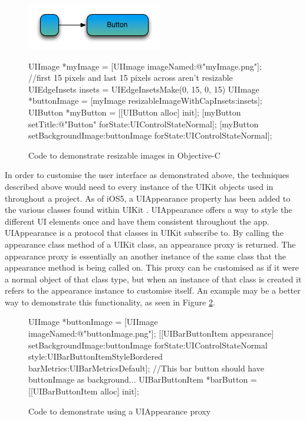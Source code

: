 \documentclass[12pt]{report}
\begin{document}
\begin{figure}[h!]
\includegraphics[scale=0.75]{images/resize-image}
\begin{objccode}
    UIImage *myImage = [UIImage imageNamed:@"myImage.png"];
    //first 15 pixels and last 15 pixels across aren't resizable
    UIEdgeInsets insets = UIEdgeInsetsMake(0, 15, 0, 15)
    UIImage *buttonImage = [myImage resizableImageWithCapInsets:insets];
    UIButton *myButton = [[UIButton alloc] init];
    [myButton setTitle:@"Button" forState:UIControlStateNormal];
    [myButton setBackgroundImage:buttonImage forState:UIControlStateNormal];
\end{objccode}
\label{fig:resizableimage}
\caption{Code to demonstrate resizable images in Objective-C}
\end{figure}


In order to customise the user interface as demonstrated above, the techniques described above would need to every instance of the UIKit objects used in throughout a project. As of iOS5, a UIAppearance property has been added to the various classes found within UIKit \cite{nshipster}. UIAppearance offers a way to style the different UI elements once and have them consistent throughout the app. UIAppearance is a protocol that classes in UIKit subscribe to. By calling the appearance class method of a UIKit class, an appearance proxy is returned. The appearance proxy is essentially an another instance of the same class that the appearance method is being called on. This proxy can be customised as if it were a normal object of that class type, but when an instance of that class is created it refers to the appearance instance to customise itself. An example may be a better way to demonstrate this functionality, as seen in Figure \ref{fig:uiappearance}.

\begin{figure}[h!]
\begin{objccode}
    UIImage *buttonImage = [UIImage imageNamed:@"buttonImage.png"];
    [[UIBarButtonItem appearance] setBackgroundImage:buttonImage
                                            forState:UIControlStateNormal
                                               style:UIBarButtonItemStyleBordered
                                          barMetrics:UIBarMetricsDefault];
    //This bar button should have buttonImage as background...
    UIBarButtonItem *barButton = [[UIBarButtonItem alloc] init];
\end{objccode}
\label{fig:uiappearance}
\caption{Code to demonstrate using a UIAppearance proxy}
\end{figure}
\end{document}
